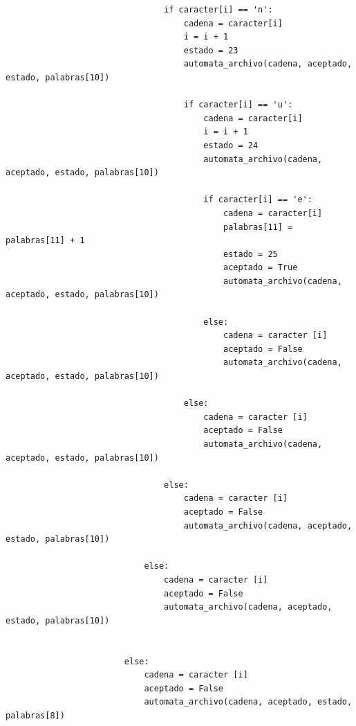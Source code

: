 \documentclass{article}
\begin{document}
\begin{flushleft}
\begin{lstlisting}
                                if caracter[i] == 'n':
                                    cadena = caracter[i]
                                    i = i + 1
                                    estado = 23
                                    automata_archivo(cadena, aceptado, estado, palabras[10])
                                    
                                    if caracter[i] == 'u':
                                        cadena = caracter[i]
                                        i = i + 1
                                        estado = 24
                                        automata_archivo(cadena, aceptado, estado, palabras[10])
                                        
                                        if caracter[i] == 'e':
                                            cadena = caracter[i]
                                            palabras[11] = palabras[11] + 1
                                            estado = 25
                                            aceptado = True
                                            automata_archivo(cadena, aceptado, estado, palabras[10])
                                            
                                        else:
                                            cadena = caracter [i]
                                            aceptado = False
                                            automata_archivo(cadena, aceptado, estado, palabras[10])
                                    
                                    else:
                                        cadena = caracter [i]
                                        aceptado = False
                                        automata_archivo(cadena, aceptado, estado, palabras[10])
                                        
                                else:
                                    cadena = caracter [i]
                                    aceptado = False
                                    automata_archivo(cadena, aceptado, estado, palabras[10])
                                    
                            else:
                                cadena = caracter [i]
                                aceptado = False
                                automata_archivo(cadena, aceptado, estado, palabras[10])
                        
                        
                        else:
                            cadena = caracter [i]
                            aceptado = False
                            automata_archivo(cadena, aceptado, estado, palabras[8])
                    

\end{lstlisting}
\end{flushleft}
\end{document}
